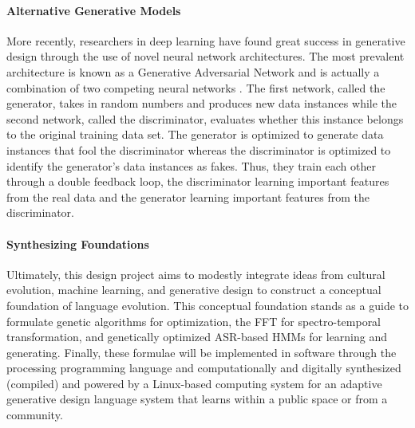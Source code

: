 \documentclass{evolang12}
\begin{document}
\paragraph{Alternative Generative Models}
More recently, researchers in deep learning have found great success in generative design through the use of novel neural network architectures. The most prevalent architecture is known as a Generative Adversarial Network and is actually a combination of two competing neural networks \cite{NIPS2014_5423}. The first network, called the generator, takes in random numbers and produces new data instances while the second network, called the discriminator, evaluates whether this instance belongs to the original training data set. The generator is optimized to generate data instances that fool the discriminator whereas the discriminator is optimized to identify the generator's data instances as fakes. Thus, they train each other through a double feedback loop, the discriminator learning important features from the real data and the generator learning important features from the discriminator.




\paragraph{Synthesizing Foundations}
Ultimately, this design project aims to modestly integrate ideas from cultural evolution, machine learning, and generative design to construct a conceptual foundation of language evolution. This conceptual foundation stands as a guide to formulate genetic algorithms for optimization, the FFT for spectro-temporal transformation, and genetically optimized ASR-based HMMs for learning and generating. Finally, these formulae will be implemented in software through the processing programming language and computationally and digitally synthesized (compiled) and powered by a Linux-based computing system for an adaptive generative design language system that learns within a public space or from a community.
\end{document}

